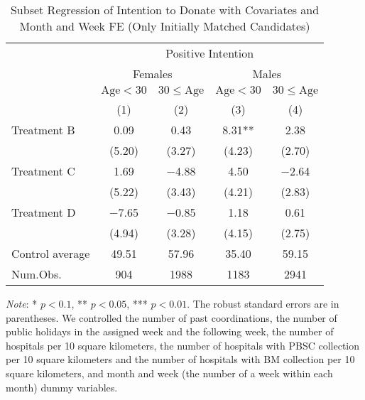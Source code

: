 \documentclass[12pt, a4paper]{article}
\begin{document}
\begin{table}[H]

\caption{\label{tab:lm-positive-subset2-init}Subset Regression of Intention to Donate with Covariates and Month and Week FE (Only Initially Matched Candidates)}
\centering
\fontsize{8}{10}\selectfont
\begin{threeparttable}
\begin{tabular}[t]{lcccc}
\toprule
\multicolumn{1}{c}{ } & \multicolumn{4}{c}{Positive Intention} \\
\cmidrule(l{3pt}r{3pt}){2-5}
\multicolumn{1}{c}{ } & \multicolumn{2}{c}{Females} & \multicolumn{2}{c}{Males} \\
\cmidrule(l{3pt}r{3pt}){2-3} \cmidrule(l{3pt}r{3pt}){4-5}
\multicolumn{1}{c}{ } & \multicolumn{1}{c}{$\text{Age} < 30$} & \multicolumn{1}{c}{$30 \le \text{Age}$} & \multicolumn{1}{c}{$\text{Age} < 30$} & \multicolumn{1}{c}{$30 \le \text{Age}$} \\
\cmidrule(l{3pt}r{3pt}){2-2} \cmidrule(l{3pt}r{3pt}){3-3} \cmidrule(l{3pt}r{3pt}){4-4} \cmidrule(l{3pt}r{3pt}){5-5}
  & (1) & (2) & (3) & (4)\\
\midrule
Treatment B & \num{0.09} & \num{0.43} & \num{8.31}** & \num{2.38}\\
 & (\num{5.20}) & (\num{3.27}) & (\num{4.23}) & (\num{2.70})\\
Treatment C & \num{1.69} & \num{-4.88} & \num{4.50} & \num{-2.64}\\
 & (\num{5.22}) & (\num{3.43}) & (\num{4.21}) & (\num{2.83})\\
Treatment D & \num{-7.65} & \num{-0.85} & \num{1.18} & \num{0.61}\\
 & (\num{4.94}) & (\num{3.28}) & (\num{4.15}) & (\num{2.75})\\
\midrule
Control average & 49.51 & 57.96 & 35.40 & 59.15\\
Num.Obs. & \num{904} & \num{1988} & \num{1183} & \num{2941}\\
\bottomrule
\end{tabular}
\begin{tablenotes}
\item \emph{Note}: * $p < 0.1$, ** $p < 0.05$, *** $p < 0.01$. The robust standard errors are in parentheses. We controlled the number of past coordinations, the number of public holidays in the assigned week and the following week, the number of hospitals per 10 square kilometers, the number of hospitals with PBSC collection per 10 square kilometers and the number of hospitals with BM collection per 10 square kilometers, and month and week (the number of a week within each month) dummy variables.
\end{tablenotes}
\end{threeparttable}
\end{table}
\end{document}
